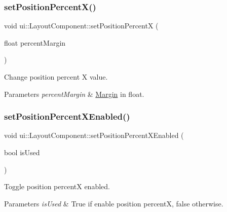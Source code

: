 \subsubsection{\texorpdfstring{set\+Position\+Percent\+X()}{setPositionPercentX()}\hspace{0.1cm}{\footnotesize\ttfamily [2/2]}}
{\footnotesize\ttfamily void ui\+::\+Layout\+Component\+::set\+Position\+PercentX (\begin{DoxyParamCaption}\item[{float}]{percent\+Margin }\end{DoxyParamCaption})}

Change position percent X value. 
\begin{DoxyParams}{Parameters}
{\em percent\+Margin} & \hyperlink{classui_1_1Margin}{Margin} in float. \\
\hline
\end{DoxyParams}
\mbox{\label{classui_1_1LayoutComponent_ae6140372921e1fd10034d9b8b90a4d7a}} 
\subsubsection{\texorpdfstring{set\+Position\+Percent\+X\+Enabled()}{setPositionPercentXEnabled()}\hspace{0.1cm}{\footnotesize\ttfamily [1/2]}}
{\footnotesize\ttfamily void ui\+::\+Layout\+Component\+::set\+Position\+Percent\+X\+Enabled (\begin{DoxyParamCaption}\item[{bool}]{is\+Used }\end{DoxyParamCaption})}

Toggle position percentX enabled. 
\begin{DoxyParams}{Parameters}
{\em is\+Used} & True if enable position percentX, false otherwise. \\
\hline
\end{DoxyParams}
\mbox{\label{classui_1_1LayoutComponent_ae6140372921e1fd10034d9b8b90a4d7a}} 
